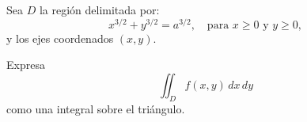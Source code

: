 Sea \( D \) la región delimitada por:
\[
x^{3/2} + y^{3/2} = a^{3/2}, \quad \text{para } x \geq 0 \text{ y } y \geq 0,
\]
y los ejes coordenados \( (x, y) \).

Expresa 
\[
\iint_D f(x, y) \, dx \, dy
\]
como una integral sobre el triángulo.

